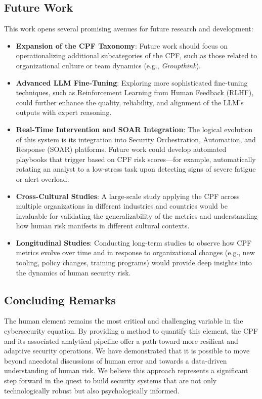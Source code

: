\documentclass[11pt, a4paper]{article}
\begin{document}
\subsection{Future Work}
This work opens several promising avenues for future research and development:
\begin{itemize}
    \item \textbf{Expansion of the CPF Taxonomy}: Future work should focus on operationalizing additional subcategories of the CPF, such as those related to organizational culture or team dynamics (e.g., \textit{Groupthink}).
    \item \textbf{Advanced LLM Fine-Tuning}: Exploring more sophisticated fine-tuning techniques, such as Reinforcement Learning from Human Feedback (RLHF), could further enhance the quality, reliability, and alignment of the LLM's outputs with expert reasoning.
    \item \textbf{Real-Time Intervention and SOAR Integration}: The logical evolution of this system is its integration into Security Orchestration, Automation, and Response (SOAR) platforms. Future work could develop automated playbooks that trigger based on CPF risk scores—for example, automatically rotating an analyst to a low-stress task upon detecting signs of severe fatigue or alert overload.
    \item \textbf{Cross-Cultural Studies}: A large-scale study applying the CPF across multiple organizations in different industries and countries would be invaluable for validating the generalizability of the metrics and understanding how human risk manifests in different cultural contexts.
    \item \textbf{Longitudinal Studies}: Conducting long-term studies to observe how CPF metrics evolve over time and in response to organizational changes (e.g., new tooling, policy changes, training programs) would provide deep insights into the dynamics of human security risk.
\end{itemize}

\subsection{Concluding Remarks}
The human element remains the most critical and challenging variable in the cybersecurity equation. By providing a method to quantify this element, the CPF and its associated analytical pipeline offer a path toward more resilient and adaptive security operations. We have demonstrated that it is possible to move beyond anecdotal discussions of human error and towards a data-driven understanding of human risk. We believe this approach represents a significant step forward in the quest to build security systems that are not only technologically robust but also psychologically informed.
\end{document}
